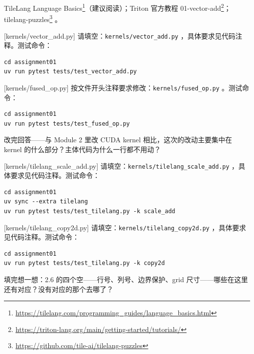 \documentclass[11pt,a4paper,fontset=none]{ctexart}
\begin{document}
\begin{reading}
TileLang Language Basics\footnote{\url{https://tilelang.com/programming_guides/language_basics.html}}（建议阅读）；Triton 官方教程 01-vector-add\footnote{\url{https://triton-lang.org/main/getting-started/tutorials/}}；tilelang-puzzles\footnote{\url{https://github.com/tile-ai/tilelang-puzzles}} 。
\end{reading}

[kernels/vector\_add.py]
请填空：\texttt{kernels/vector\_add.py} ，具体要求见代码注释。测试命令：

\begin{lstlisting}
cd assignment01
uv run pytest tests/test_vector_add.py
\end{lstlisting}

[kernels/fused\_op.py]
按文件开头注释要求修改：\texttt{kernels/fused\_op.py} 。测试命令：

\begin{lstlisting}
cd assignment01
uv run pytest tests/test_fused_op.py
\end{lstlisting}

改完回答——与 Module 2 里改 CUDA kernel 相比，这次的改动主要集中在 kernel 的什么部分？主体代码为什么一行都不用动？


[kernels/tilelang\_scale\_add.py]
请填空：\texttt{kernels/tilelang\_scale\_add.py} ，具体要求见代码注释。测试命令：

\begin{lstlisting}
cd assignment01
uv sync --extra tilelang
uv run pytest tests/test_tilelang.py -k scale_add
\end{lstlisting}

[kernels/tilelang\_copy2d.py]
请填空：\texttt{kernels/tilelang\_copy2d.py} ，具体要求见代码注释。测试命令：

\begin{lstlisting}
cd assignment01
uv run pytest tests/test_tilelang.py -k copy2d
\end{lstlisting}

填完想一想：2.6 的四个空——行号、列号、边界保护、grid 尺寸——哪些在这里还有对应？没有对应的那个去哪了？

\end{document}
